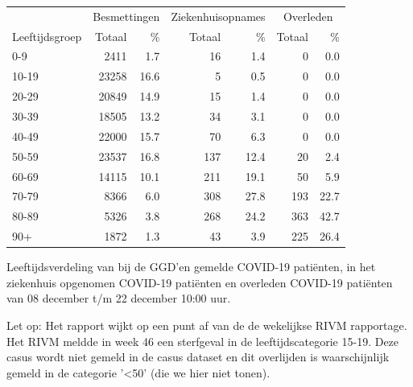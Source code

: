 \documentclass[
  english,
  man,floatsintext]{apa6}
\begin{document}
\begin{table}[H]
\centering\begingroup\fontsize{11}{13}\selectfont

\begin{threeparttable}
\begin{tabular}{lrrrrrr}
\toprule
\multicolumn{1}{c}{ } & \multicolumn{2}{c}{Besmettingen} & \multicolumn{2}{c}{Ziekenhuisopnames} & \multicolumn{2}{c}{Overleden} \\
\cmidrule(l{3pt}r{3pt}){2-3} \cmidrule(l{3pt}r{3pt}){4-5} \cmidrule(l{3pt}r{3pt}){6-7}
Leeftijdsgroep & Totaal & \% & Totaal & \% & Totaal & \%\\
\midrule
0-9 & 2411 & 1.7 & 16 & 1.4 & 0 & 0.0\\
10-19 & 23258 & 16.6 & 5 & 0.5 & 0 & 0.0\\
20-29 & 20849 & 14.9 & 15 & 1.4 & 0 & 0.0\\
30-39 & 18505 & 13.2 & 34 & 3.1 & 0 & 0.0\\
40-49 & 22000 & 15.7 & 70 & 6.3 & 0 & 0.0\\
50-59 & 23537 & 16.8 & 137 & 12.4 & 20 & 2.4\\
60-69 & 14115 & 10.1 & 211 & 19.1 & 50 & 5.9\\
70-79 & 8366 & 6.0 & 308 & 27.8 & 193 & 22.7\\
80-89 & 5326 & 3.8 & 268 & 24.2 & 363 & 42.7\\
90+ & 1872 & 1.3 & 43 & 3.9 & 225 & 26.4\\
\bottomrule
\end{tabular}
\begin{tablenotes}
\item[1] Leeftijdsverdeling van bij de GGD’en gemelde COVID-19 patiënten, in het ziekenhuis opgenomen COVID-19 patiënten en overleden COVID-19 patiënten van 08 december t/m 22 december 10:00 uur.
\item[2] Let op: Het rapport wijkt op een punt af van de de wekelijkse RIVM rapportage. Het RIVM meldde in week 46 een sterfgeval in de leeftijdscategorie 15-19. Deze casus wordt niet gemeld in de casus dataset en dit overlijden is waarschijnlijk gemeld in de categorie '<50' (die we hier niet tonen).
\end{tablenotes}
\end{threeparttable}
\endgroup{}
\end{table}

\newpage
\end{document}

